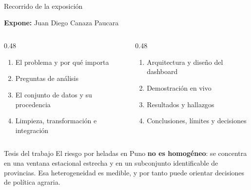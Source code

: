\documentclass[aspectratio=169,11pt]{beamer}
\newcommand{\ponente}[1]{%
  \begin{flushright}\tiny\textcolor{pnBrandDark}{\textbf{Expone:} #1}\end{flushright}%
  \vspace{-0.9em}%
}
\begin{document}
\begin{frame}{Recorrido de la exposición}
  \ponente{Juan Diego Canaza Paucara}
  \small
  \begin{columns}[T,onlytextwidth]
    \begin{column}{0.48\textwidth}
      \begin{enumerate}\itemsep0.35em
        \item El problema y por qué importa
        \item Preguntas de análisis
        \item El conjunto de datos y su procedencia
        \item Limpieza, transformación e integración
      \end{enumerate}
    \end{column}
    \begin{column}{0.48\textwidth}
      \begin{enumerate}\itemsep0.35em
        \setcounter{enumi}{4}
        \item Arquitectura y diseño del dashboard
        \item Demostración en vivo
        \item Resultados y hallazgos
        \item Conclusiones, límites y decisiones
      \end{enumerate}
    \end{column}
  \end{columns}

  \vspace{0.9em}
  \begin{block}{Tesis del trabajo}
    \small El riesgo por heladas en Puno \textbf{no es homogéneo}: se concentra en una ventana
    estacional estrecha y en un subconjunto identificable de provincias. Esa heterogeneidad es
    medible, y por tanto puede orientar decisiones de política agraria.
  \end{block}
\end{frame}
\end{document}
